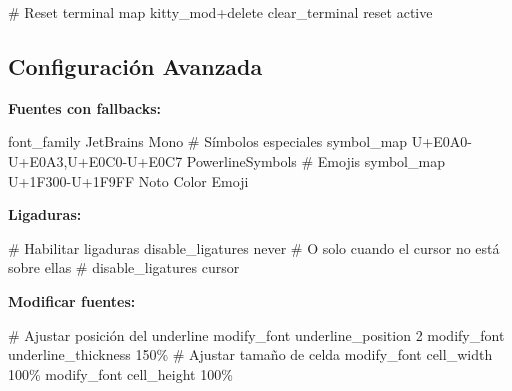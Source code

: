 \documentclass[
  doc,
  floatsintext,
  longtable,
  a4paper,
  nolmodern,
  notxfonts,
  notimes,
  12pt,
  colorlinks=true,linkcolor=blue,citecolor=blue,urlcolor=blue]{apa7}
\newenvironment{Shaded}{\begin{snugshade}}{\end{snugshade}}
\newcommand{\CommentTok}[1]{\textcolor[rgb]{0.37,0.37,0.37}{#1}}
\newcommand{\DataTypeTok}[1]{\textcolor[rgb]{0.68,0.00,0.00}{#1}}
\newcommand{\ErrorTok}[1]{\textcolor[rgb]{0.68,0.00,0.00}{#1}}
\begin{document}
\begin{Shaded}
\begin{Highlighting}[]
\CommentTok{\# Reset terminal}
\DataTypeTok{map} \DataTypeTok{kitty\_mod}\ErrorTok{+}\DataTypeTok{delete} \DataTypeTok{clear\_terminal} \DataTypeTok{reset} \DataTypeTok{active}
\end{Highlighting}
\end{Shaded}

\subsection{Configuración Avanzada}\label{configuraciuxf3n-avanzada}

\textbf{Fuentes con fallbacks:}

\begin{Shaded}
\begin{Highlighting}[]
\DataTypeTok{font\_family}      \DataTypeTok{JetBrains} \DataTypeTok{Mono}
\CommentTok{\# Símbolos especiales}
\DataTypeTok{symbol\_map} \DataTypeTok{U}\ErrorTok{+}\DataTypeTok{E0A0{-}U}\ErrorTok{+}\DataTypeTok{E0A3}\ErrorTok{,}\DataTypeTok{U}\ErrorTok{+}\DataTypeTok{E0C0{-}U}\ErrorTok{+}\DataTypeTok{E0C7} \DataTypeTok{PowerlineSymbols}
\CommentTok{\# Emojis}
\DataTypeTok{symbol\_map} \DataTypeTok{U}\ErrorTok{+}\DataTypeTok{1F300{-}U}\ErrorTok{+}\DataTypeTok{1F9FF} \DataTypeTok{Noto} \DataTypeTok{Color} \DataTypeTok{Emoji}
\end{Highlighting}
\end{Shaded}

\textbf{Ligaduras:}

\begin{Shaded}
\begin{Highlighting}[]
\CommentTok{\# Habilitar ligaduras}
\DataTypeTok{disable\_ligatures} \DataTypeTok{never}
\CommentTok{\# O solo cuando el cursor no está sobre ellas}
\CommentTok{\# disable\_ligatures cursor}
\end{Highlighting}
\end{Shaded}

\textbf{Modificar fuentes:}

\begin{Shaded}
\begin{Highlighting}[]
\CommentTok{\# Ajustar posición del underline}
\DataTypeTok{modify\_font} \DataTypeTok{underline\_position} \DataTypeTok{2}
\DataTypeTok{modify\_font} \DataTypeTok{underline\_thickness} \DataTypeTok{150}\ErrorTok{\%}
\CommentTok{\# Ajustar tamaño de celda}
\DataTypeTok{modify\_font} \DataTypeTok{cell\_width} \DataTypeTok{100}\ErrorTok{\%}
\DataTypeTok{modify\_font} \DataTypeTok{cell\_height} \DataTypeTok{100}\ErrorTok{\%}
\end{Highlighting}
\end{Shaded}
\end{document}
